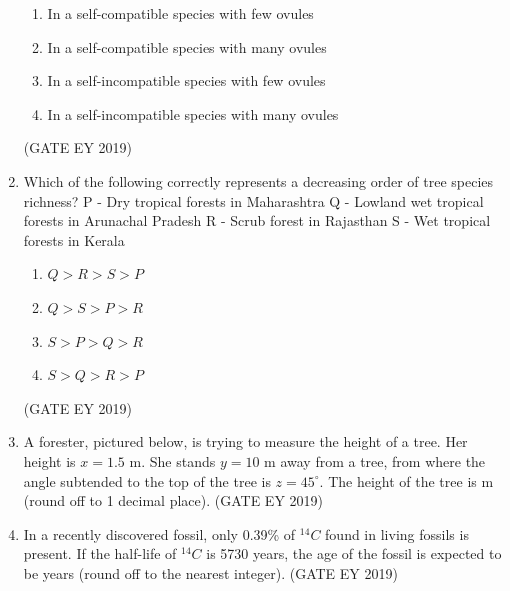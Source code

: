 \documentclass[journal,12pt,onecolumn]{IEEEtran}
\theoremstyle{remark}
\begin{document}
\begin{enumerate}[resume]
\begin{enumerate}
\item In a self-compatible species with few ovules
\item In a self-compatible species with many ovules
\item In a self-incompatible species with few ovules
\item In a self-incompatible species with many ovules
\end{enumerate}

\hfill{(GATE EY 2019)}
\item Which of the following correctly represents a decreasing order of tree species richness?  
P - Dry tropical forests in Maharashtra  
Q  - Lowland wet tropical forests in Arunachal Pradesh  
R - Scrub forest in Rajasthan  
S  - Wet tropical forests in Kerala

\begin{multicols}{2}
\begin{enumerate}
\item $Q > R > S > P$
\item $Q > S > P > R$
\item $S > P > Q > R$
\item $S > Q > R > P$
\end{enumerate}
\end{multicols}
\hfill{(GATE EY 2019)}


\item A forester, pictured below, is trying to measure the height of a tree. Her height is $x=1.5$ m. She stands $y=10$ m away from a tree, from where the angle subtended to the top of the tree is $z=45^\circ$. The height of the tree is \underline{\hspace{1.5cm}} m (round off to 1 decimal place).
\hfill{(GATE EY 2019)}
\item In a recently discovered fossil, only 0.39\% of $^{14}C$ found in living fossils is present. If the half-life of $^{14}C$ is 5730 years, the age of the fossil is expected to be\underline{\hspace{1.5cm}} years (round off to the nearest integer).
\hfill{(GATE EY 2019)}


\end{enumerate}
\end{document}
